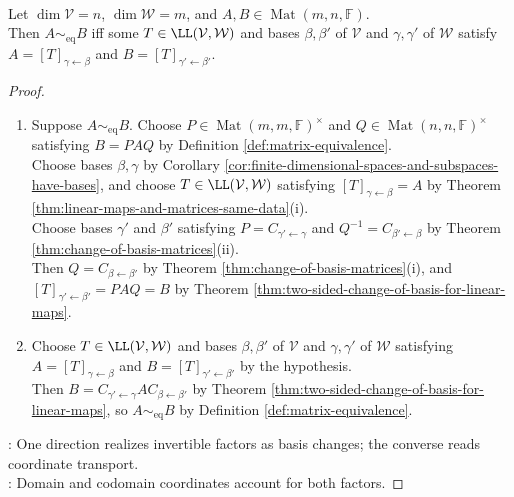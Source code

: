 \begin{theorem} \label{thm:matrix-equivalence-same-linear-map} \\
Let $\dim\mathcal{V}=n$, $\dim\mathcal{W}=m$, and $A,B\in\operatorname{Mat}(m,n,\mathbb{F})$.\\
Then $A\sim_{\mathrm{eq}}B$ iff some $T\in\LL(\mathcal{V},\mathcal{W})$ and bases $\beta,\beta'$ of $\mathcal{V}$ and $\gamma,\gamma'$ of $\mathcal{W}$ satisfy $A=[T]_{\gamma\leftarrow\beta}$ and $B=[T]_{\gamma'\leftarrow\beta'}$.
\begin{proof}
\begin{enumerate}[label=\roman*.]
\setlength{\itemsep}{0pt}
\item[$(\Rightarrow)$] Suppose $A\sim_{\mathrm{eq}}B$. Choose $P\in\operatorname{Mat}(m,m,\mathbb{F})^{\times}$ and $Q\in\operatorname{Mat}(n,n,\mathbb{F})^{\times}$ satisfying $B=PAQ$ by Definition \ref{def:matrix-equivalence}.\\
Choose bases $\beta,\gamma$ by Corollary \ref{cor:finite-dimensional-spaces-and-subspaces-have-bases}, and choose $T\in\LL(\mathcal{V},\mathcal{W})$ satisfying $[T]_{\gamma\leftarrow\beta}=A$ by Theorem \ref{thm:linear-maps-and-matrices-same-data}(i).\\
Choose bases $\gamma'$ and $\beta'$ satisfying $P=C_{\gamma'\leftarrow\gamma}$ and $Q^{-1}=C_{\beta'\leftarrow\beta}$ by Theorem \ref{thm:change-of-basis-matrices}(ii).\\
Then $Q=C_{\beta\leftarrow\beta'}$ by Theorem \ref{thm:change-of-basis-matrices}(i), and $[T]_{\gamma'\leftarrow\beta'}=PAQ=B$ by Theorem \ref{thm:two-sided-change-of-basis-for-linear-maps}.
\item[$(\Leftarrow)$] Choose $T\in\LL(\mathcal{V},\mathcal{W})$ and bases $\beta,\beta'$ of $\mathcal{V}$ and $\gamma,\gamma'$ of $\mathcal{W}$ satisfying $A=[T]_{\gamma\leftarrow\beta}$ and $B=[T]_{\gamma'\leftarrow\beta'}$ by the hypothesis.\\
Then $B=C_{\gamma'\leftarrow\gamma}AC_{\beta\leftarrow\beta'}$ by Theorem \ref{thm:two-sided-change-of-basis-for-linear-maps}, so $A\sim_{\mathrm{eq}}B$ by Definition \ref{def:matrix-equivalence}.
\end{enumerate}
: One direction realizes invertible factors as basis changes; the converse reads coordinate transport.\\
: Domain and codomain coordinates account for both factors.
\end{proof}
\end{theorem}

